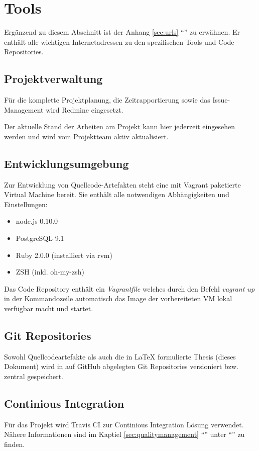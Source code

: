 \section{Tools}

Ergänzend zu diesem Abschnitt ist der Anhang \ref{sec:urls} ``'' zu erwähnen. Er enthält alle wichtigen Internetadressen zu den spezifischen Tools und Code Repositories.

\subsection{Projektverwaltung}
Für die komplette Projektplanung, die Zeitrapportierung sowie das Issue-Management wird Redmine eingesetzt.

Der aktuelle Stand der Arbeiten am Projekt kann hier jederzeit eingesehen werden und wird vom Projektteam aktiv aktualisiert.


\subsection{Entwicklungsumgebung}
Zur Entwicklung von Quellcode-Artefakten steht eine mit Vagrant \cite{Vagrant} paketierte Virtual Machine bereit. Sie enthält alle notwendigen Abhängigkeiten und Einstellungen:


\begin{itemize}
	\item node.js 0.10.0
	\item PostgreSQL 9.1
	\item Ruby 2.0.0 (installiert via rvm)
	\item ZSH (inkl. oh-my-zsh)
\end{itemize}

Das Code Repository enthält ein \emph{Vagrantfile} welches durch den Befehl \emph{vagrant up} in der Kommandozeile automatisch das Image der vorbereiteten VM lokal verfügbar macht und startet.

\subsection{Git Repositories}
Sowohl Quellcodeartefakte als auch die in LaTeX formulierte Thesis (dieses Dokument) wird in auf GitHub abgelegten Git Repositories versioniert bzw. zentral gespeichert.

\subsection{Continious Integration}
Für das Projekt wird Travis CI zur Continious Integration Lösung verwendet. Nähere Informationen sind im Kaptiel \ref{sec:qualitymanagement} ``'' unter ``'' zu finden.